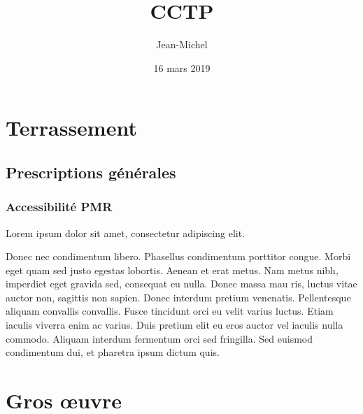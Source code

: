 \documentclass[twoside]{report}
\title{CCTP}
\author{Jean-Michel \bsc{Cherel}}
\date{16 mars 2019}
\begin{document}
\sffamily
\maketitle

\renewcommand{\contentsname}{\textsf{Sommaire}}

\setcounter{tocdepth}{1} %
\tableofcontents

\renewcommand{\chaptername}{\textsf{Lot \no}}

\chapter{\textsf{Terrassement}}

\section{\textsf{Prescriptions générales}}

\subsection{\textsf{Accessibilité PMR}}

\noindent Lorem ipsum dolor sit amet, consectetur adipiscing elit.

\noindent Donec nec condimentum libero. Phasellus condimentum porttitor congue.
Morbi eget quam sed justo egestas lobortis. Aenean et erat metus.
Nam metus nibh, imperdiet eget gravida sed, consequat eu nulla.
Donec massa mau ris, luctus vitae auctor non, sagittis non sapien.
Donec interdum pretium venenatis. Pellentesque aliquam convallis convallis.
Fusce tincidunt orci eu velit varius luctus.
Etiam iaculis viverra enim ac varius.
Duis pretium elit eu eros auctor vel iaculis nulla commodo.
Aliquam interdum fermentum orci sed fringilla.
Sed euismod condimentum dui, et pharetra ipsum dictum quis.

\chapter{\textsf{Gros œuvre}}
\end{document}
